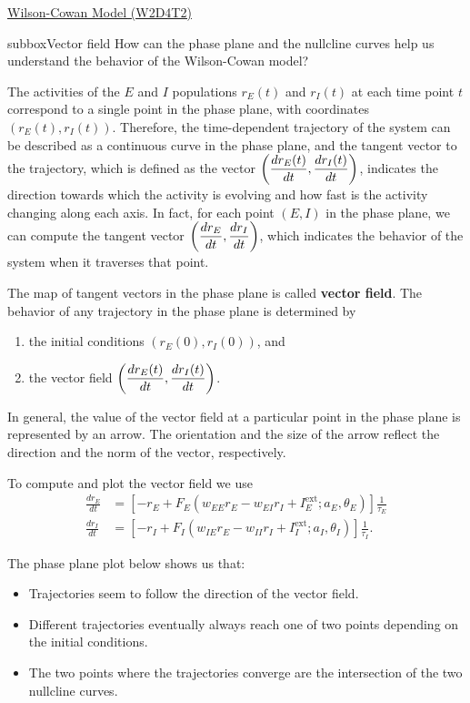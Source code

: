 \begin{textbox}{\href{https://compneuro.neuromatch.io/tutorials/W2D4_DynamicNetworks/chapter_title.html}{Wilson-Cowan Model (W2D4T2)} }

\begin{subbox}{subbox}{Vector field}
\scriptsize
How can the phase plane and the nullcline curves help us understand the behavior of the Wilson-Cowan model?

The activities of the $E$ and $I$ populations $r_E(t)$ and $r_I(t)$ at each time point $t$ correspond to a single point in the phase plane, with coordinates $(r_E(t),r_I(t))$. Therefore, the time-dependent trajectory of the system can be described as a continuous curve in the phase plane, and the tangent vector to the trajectory, which is defined as the vector $\bigg{(}\displaystyle{\frac{dr_E(t)}{dt},\frac{dr_I(t)}{dt}}\bigg{)}$, indicates the direction towards which the activity is evolving and how fast is the activity changing along each axis. In fact, for each point $(E,I)$ in the phase plane, we can compute the tangent vector $\bigg{(}\displaystyle{\frac{dr_E}{dt},\frac{dr_I}{dt}}\bigg{)}$, which  indicates the behavior of the system when it traverses that point. 

The map of tangent vectors in the phase plane is called \textbf{vector field}. The behavior of any trajectory in the phase plane is determined by \begin{enumerate}
    \item 
the initial conditions $(r_E(0),r_I(0))$, and 
\item the vector field $\bigg{(}\displaystyle{\frac{dr_E(t)}{dt},\frac{dr_I(t)}{dt}}\bigg{)}$.
\end{enumerate} 
In general, the value of the vector field at a particular point in the phase plane is represented by an arrow. The orientation and the size of the arrow reflect the direction and the norm of the vector, respectively.

To compute and plot the vector field we use
\begin{align*}
\frac{dr_E}{dt} &= [-r_E + F_E(w_{EE}r_E -w_{EI}r_I + I^{\text{ext}}_E;a_E,\theta_E)]\frac{1}{\tau_E}\\
\frac{dr_I}{dt} &= [-r_I + F_I(w_{IE}r_E -w_{II}r_I + I^{\text{ext}}_I;a_I,\theta_I)]\frac{1}{\tau_I}.   
\end{align*}

The phase plane plot below shows us that:

\begin{itemize}
    \item 
 Trajectories seem to follow the direction of the vector field.
\item Different trajectories eventually always reach one of two points depending on the initial conditions.
\item The two points where the trajectories converge are the intersection of the two nullcline curves.
\end{itemize}



\end{subbox}
\end{textbox}
